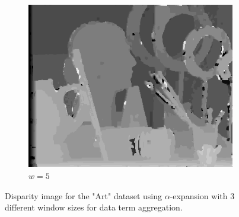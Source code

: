 \documentclass[letterpaper, 10 pt, conference]{ieeeconf}  %
\begin{document}
\begin{figure}[t]
        \begin{subfigure}[b]{0.3\textwidth}
                \centering
                \includegraphics[width=\textwidth]{imgs/l4disparity-expansion-w5.png}
                \caption{$w = 5$}
                \label{fig:farm}
        \end{subfigure}
        \caption{Disparity image for the "Art" dataset using $\alpha$-expansion with 3 different window sizes for data term aggregation.}
        \label{window}
\end{figure}
\end{document}
